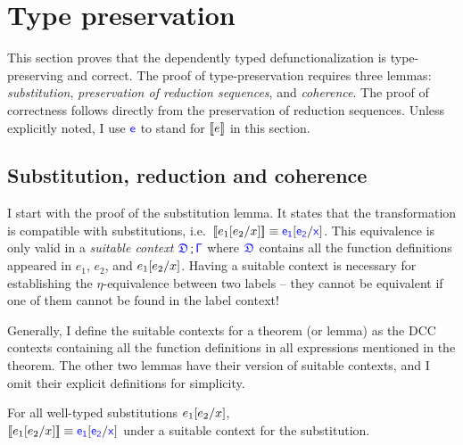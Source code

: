 
\section{Type preservation}

This section proves that the dependently typed defunctionalization is type-preserving and correct. The proof of type-preservation requires three lemmas: \textit{substitution}, \textit{preservation of reduction sequences}, and \textit{coherence}. The proof of correctness follows directly from the preservation of reduction sequences. Unless explicitly noted, I use $\target{e}$ to stand for ${[\![ e ]\!]}$ in this section.

\subsection{Substitution, reduction and coherence}

I start with the proof of the substitution lemma. It states that the transformation is compatible with substitutions, i.e.~$\bbracket{e_1 \sub{e_2}{x}} \equiv \target{e_1} \sub{\target{e_2}}{\target{x}}$. This equivalence is only valid in a \textit{suitable context} $\targetcon$ where $\target{\fdef}$ contains all the function definitions appeared in $e_1$, $e_2$, and $e_1[e_2\slash x]$. Having a suitable context is necessary for establishing the  $\eta$-equivalence between two labels -- they cannot be equivalent if one of them cannot be found in the label context!

Generally, I define the suitable contexts for a theorem (or lemma) as the DCC contexts containing all the function definitions in all expressions mentioned in the theorem. The other two lemmas have their version of suitable contexts, and I omit their explicit definitions for simplicity.

\begin{lemma}[Substitution] For all well-typed substitutions $e_1 [e_2\slash x]$,\\
$\bbracket{e_1 \sub{e_2}{x}} \equiv \target{e_1}\sub{\target{e_2}}{\target{x}}$ under a suitable context for the substitution.

\label{lem:sub}
\end{lemma}
